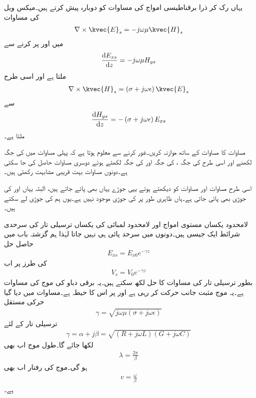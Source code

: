 یہاں رک کر ذرا برقناطیسی امواج کی مساوات کو دوبارہ پیش کرتے ہیں۔میکس ویل کی مساوات
\begin{align*}
\nabla \times \kvec{E}_s=-j \omega \mu \kvec{H}_s
\end{align*}
میں  اور   پر کرنے سے
\begin{align}\label{مساوات_ترسیل_برقی_شدت_تفرقی_مساوات}
\frac{\dif E_{xs}}{\dif z}=-j \omega \mu H_{ys}
\end{align}
ملتا ہے اور اسی طرح
\begin{align*}
\nabla \times \kvec{H}_s=\left(\sigma+j\omega \epsilon \right)\kvec{E}_s
\end{align*}
سے
\begin{align}\label{مساوات_ترسیل_مقناطیسی_شدت_تفرقی_مساوات}
\frac{\dif H_{ys}}{\dif z}=-\left(\sigma+j \omega \epsilon \right) E_{xs}
\end{align}
ملتا ہے۔

مساوات  کا مساوات  کے ساتھ موازنہ کریں۔غور کرنے سے معلوم ہوتا ہے کہ پہلی مساوات میں  کی جگہ  لکھنے اور اسی طرح  کی جگہ ،  کی جگہ  اور  کی جگہ  لکھتے ہوئے دوسری مساوات حاصل کی جا سکتی ہے۔دونوں مساوات بہت قریبی مشابہت رکھتی ہیں۔

اسی طرح مساوات  اور مساوات  کو دیکھتے ہوئے  یہی جوڑے یہاں بھی پائے جاتے ہیں، البتہ یہاں  اور  کی جوڑی بھی پائی جاتی ہے۔ہاں ظاہری طور پر  کی جوڑی موجود نہیں ہے۔یوں ہم  کی جوڑی  لے سکتے ہیں۔

لامحدود یکساں مستوی امواج اور لامحدود لمبائی کی یکساں ترسیلی تار کی سرحدی شرائط ایک جیسی ہیں۔دونوں میں سرحد پائی ہی نہیں جاتا لہٰذا  ہم گزشتہ باب میں حاصل حل
\begin{align*}
E_{xs}=E_{x0} e^{- \gamma z}
\end{align*}
کی طرز پر اب
\begin{align}
V_s=V_0 e^{- \gamma z}
\end{align}
بطور ترسیلی تار کی مساوات کا حل لکھ سکتے ہیں۔یہ برقی دباو کی موج کی مساوات ہے۔یہ موج مثبت  جانب حرکت کر رہی ہے اور  پر اس کا حیطہ  ہے۔مساوات  میں دیا گیا حرکی مستقل
\begin{align*}
\gamma=\sqrt{j \omega \mu (\sigma +j\omega \epsilon)}
\end{align*}
ترسیلی تار کے لئے
\begin{align}
\gamma=\alpha+j\beta=\sqrt{(R+j\omega L)(G+j\omega C)}
\end{align}
لکھا جائے گا۔طول موج اب بھی
\begin{align}
\lambda=\frac{2\pi}{\beta}
\end{align}
ہو گی۔موج کی رفتار اب بھی
\begin{align}
v=\frac{\omega}{\beta}
\end{align}
ہے۔

